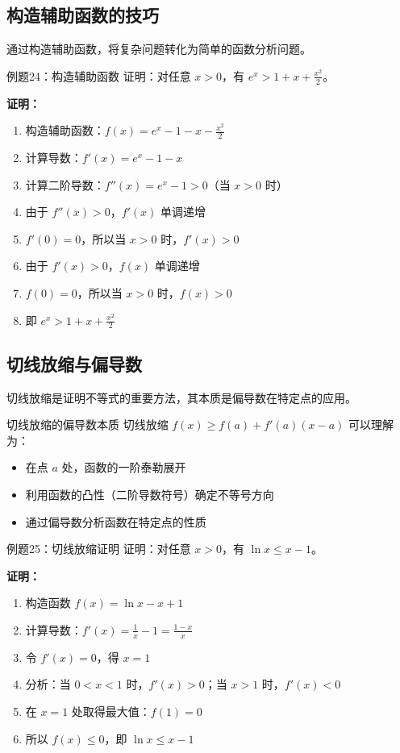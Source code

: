 \documentclass[a4paper,11pt]{ctexart}
\theoremstyle{definition}
\theoremstyle{remark}
\begin{document}
\subsection{构造辅助函数的技巧}

通过构造辅助函数，将复杂问题转化为简单的函数分析问题。

\begin{examplebox}{例题24：构造辅助函数}
证明：对任意 $x > 0$，有 $e^x > 1 + x + \frac{x^2}{2}$。

\textbf{证明：}
\begin{enumerate}
    \item 构造辅助函数：$f(x) = e^x - 1 - x - \frac{x^2}{2}$
    \item 计算导数：$f'(x) = e^x - 1 - x$
    \item 计算二阶导数：$f''(x) = e^x - 1 > 0$（当 $x > 0$ 时）
    \item 由于 $f''(x) > 0$，$f'(x)$ 单调递增
    \item $f'(0) = 0$，所以当 $x > 0$ 时，$f'(x) > 0$
    \item 由于 $f'(x) > 0$，$f(x)$ 单调递增
    \item $f(0) = 0$，所以当 $x > 0$ 时，$f(x) > 0$
    \item 即 $e^x > 1 + x + \frac{x^2}{2}$
\end{enumerate}
\end{examplebox}

\subsection{切线放缩与偏导数}

切线放缩是证明不等式的重要方法，其本质是偏导数在特定点的应用。

\begin{conceptbox}{切线放缩的偏导数本质}
切线放缩 $f(x) \geq f(a) + f'(a)(x-a)$ 可以理解为：
\begin{itemize}
    \item 在点 $a$ 处，函数的一阶泰勒展开
    \item 利用函数的凸性（二阶导数符号）确定不等号方向
    \item 通过偏导数分析函数在特定点的性质
\end{itemize}
\end{conceptbox}

\begin{examplebox}{例题25：切线放缩证明}
证明：对任意 $x > 0$，有 $\ln x \leq x - 1$。

\textbf{证明：}
\begin{enumerate}
    \item 构造函数 $f(x) = \ln x - x + 1$
    \item 计算导数：$f'(x) = \frac{1}{x} - 1 = \frac{1-x}{x}$
    \item 令 $f'(x) = 0$，得 $x = 1$
    \item 分析：当 $0 < x < 1$ 时，$f'(x) > 0$；当 $x > 1$ 时，$f'(x) < 0$
    \item 在 $x = 1$ 处取得最大值：$f(1) = 0$
    \item 所以 $f(x) \leq 0$，即 $\ln x \leq x - 1$
\end{enumerate}
\end{examplebox}
\end{document}
